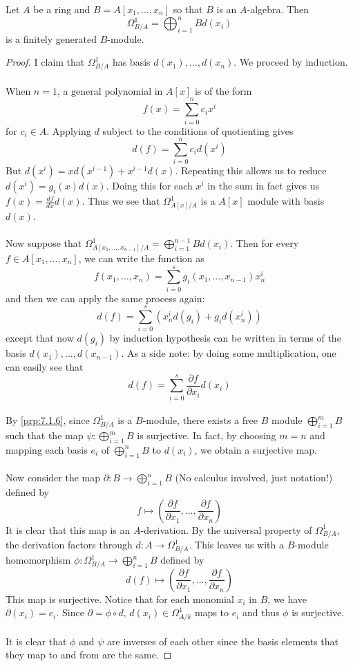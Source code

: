 \documentclass[a4paper]{article}
\begin{document}
\begin{lmm}{}{} Let $A$ be a ring and $B=A[x_1,\dots,x_n]$ so that $B$ is an $A$-algebra. Then $$\Omega_{B/A}^1=\bigoplus_{i=1}^nBd(x_i)$$ 
is a finitely generated $B$-module. \tcbline
\begin{proof}
I claim that  $\Omega_{B/A}^1$ has basis $d(x_1),\dots,d(x_n)$. 
We proceed by induction. \\~\\

When $n=1$, a general polynomial in $A[x]$ is of the form $$f(x)=\sum_{i=0}^nc_ix^i$$ for $c_i\in A$. Applying $d$ subject to the conditions of quotienting gives $$d(f)=\sum_{i=0}^nc_id(x^i)$$ But $d(x^i)=xd(x^{i-1})+x^{i-1}d(x)$. Repeating this allows us to reduce $d(x^i)=g_i(x)d(x)$. Doing this for each $x^i$ in the sum in fact gives us $f(x)=\frac{df}{dx}d(x)$. Thus we see that $\Omega_{A[x]/A}^1$ is a $A[x]$ module with basis $d(x)$. \\~\\

Now suppose that $\Omega_{A[x_1,\dots,x_{n-1}]/A}^1=\bigoplus_{i=1}^{n-1}Bd(x_i)$. Then for every $f\in A[x_1,\dots,x_n]$, we can write the function as $$f(x_1,\dots,x_n)=\sum_{i=0}^sg_i(x_1,\dots,x_{n-1})x_n^i$$ and then we can apply the same process again: $$d(f)=\sum_{i=0}^s(x_n^id(g_i)+g_id(x_n^i))$$ except that now $d(g_i)$ by induction hypothesis can be written in terms of the basis $d(x_1),\dots,d(x_{n-1})$. As a side note: by doing some multiplication, one can easily see that $$d(f)=\sum_{i=0}^s\frac{\partial f}{\partial x_i}d(x_i)$$~\\

By \ref{prp:7.1.6}, since $\Omega_{B/A}^1$ is a $B$-module, there exists a free $B$ module $\bigoplus_{i=1}^mB$ such that the map $\psi:\bigoplus_{i=1}^mB$ is surjective. In fact, by choosing $m=n$ and mapping each basis $e_i$ of $\bigoplus_{i=1}^nB$ to $d(x_i)$, we obtain a surjective map. \\~\\

Now consider the map $\partial:B\to\bigoplus_{i=1}^nB$ (No calculus involved, just notation!) defined by $$f\mapsto\left(\frac{\partial f}{\partial x_1},\dots,\frac{\partial f}{\partial x_n}\right)$$ It is clear that this map is an $A$-derivation. By the universal property of $\Omega_{B/A}^1$, the derivation factors through $d:A\to\Omega_{B/A}^1$. This leaves us with a $B$-module homomorphism $\phi:\Omega_{B/A}^1\to\bigoplus_{i=1}^nB$ defined by $$d(f)\mapsto\left(\frac{\partial f}{\partial x_1},\dots,\frac{\partial f}{\partial x_n}\right)$$ This map is surjective. Notice that for each monomial $x_i$ in $B$, we have $\partial(x_i)=e_i$. Since $\partial=\phi\circ d$, $d(x_i)\in\Omega_{A/k}^1$ maps to $e_i$ and thus $\phi$ is surjective. \\~\\

It is clear that $\phi$ and $\psi$ are inverses of each other since the basis elements that they map to and from are the same. 
\end{proof}
\end{lmm}
\end{document}
